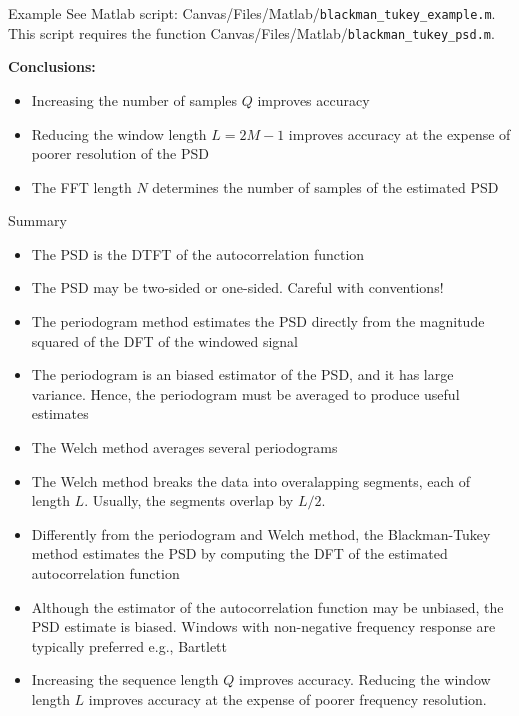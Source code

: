 \documentclass[10pt]{beamer}
\begin{document}
\begin{frame}{Example}
	See Matlab script: Canvas/Files/Matlab/\texttt{blackman\_tukey\_example.m}. This script requires the function Canvas/Files/Matlab/\texttt{blackman\_tukey\_psd.m}.
	
	\vspace{0.25cm}
	\textbf{Conclusions:} 
	\begin{itemize}
		\item Increasing the number of samples $Q$ improves accuracy
		\item Reducing the window length $L = 2M-1$ improves accuracy at the expense of poorer resolution of the PSD
		\item The FFT length $N$ determines the number of samples of the estimated PSD
	\end{itemize}
\end{frame}


%
\begin{frame}{Summary}
	\begin{itemize}
		\item The PSD is the DTFT of the autocorrelation function
		\item The PSD may be two-sided or one-sided. Careful with conventions!
		\item The periodogram method estimates the PSD directly from the magnitude squared of the DFT of the windowed signal
		\item The periodogram is an biased estimator of the PSD, and it has large variance. Hence, the periodogram must be averaged to produce useful estimates
		\item The Welch method averages several periodograms
		\item The Welch method breaks the data into overalapping segments, each of length $L$. Usually, the segments overlap by $L/2$.
		\item Differently from the periodogram and Welch method, the Blackman-Tukey method estimates the PSD by computing the DFT of the estimated autocorrelation function
		\item Although the estimator of the autocorrelation function may be unbiased, the PSD estimate is biased. Windows with non-negative frequency response are typically preferred e.g., Bartlett
		\item Increasing the sequence length $Q$ improves accuracy. Reducing the window length $L$ improves accuracy at the expense of poorer frequency resolution.
	\end{itemize}
\end{frame}
\end{document}
